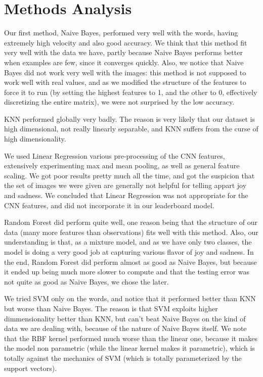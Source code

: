 \documentclass[11pt,twocolumn]{report}
\begin{document}
\section *{Methods Analysis}

    Our first method, Naive Bayes, performed very well with the words, having extremely high velocity and also good accuracy. We think that this method fit very well with the data we have, partly because Naive Bayes performs better when examples are few, since it converges quickly. Also, we notice that Naive Bayes did not work very well with the images: this method is not supposed to work well with real values, and as we modified the structure of the features to force it to run (by setting the highest features to 1, and the other to 0, effectively discretizing the entire matrix), we were not surprised by the low accuracy.
    \par
    KNN performed globally very badly. The reason is very likely that our dataset is high dimensional, not really linearly separable, and KNN suffers from the curse of high dimensionality.
    \par
    We used Linear Regression various pre-processing of the CNN features, extensively experimenting max and mean pooling, as well as general feature scaling. We got poor results pretty much all the time, and got the suspicion that the set of images we were given are generally not helpful for telling appart joy and sadness. We concluded that Linear Regression was not appropriate for the CNN features, and did not incorporate it in our leaderboard model.
    \par
    Random Forest did perform quite well, one reason being that the structure of our data (many more features than observations) fits well with this method. Also, our understanding is that, as a mixture model, and as we have only two classes, the model is doing a very good job at capturing various flavor of joy and sadness. In the end, Random Forest did perform almost as good as Naive Bayes, but because it ended up being much more slower to compute and that the testing error was not quite as good as Naive Bayes, we chose the later.
    \par
    We tried SVM only on the words, and notice that it performed better than KNN but worse than Naive Bayes. The reason is that SVM exploits higher dimmensionality better than KNN, but can't beat Naive Bayes on the kind of data we are dealing with, because of the nature of Naive Bayes itself. We note that the RBF kernel performed much worse than the linear one, because it makes the model non parametric (while the linear kernel makes it parametric), which is totally against the mechanics of SVM (which is totally parameterized by the support vectors).
\end{document}
